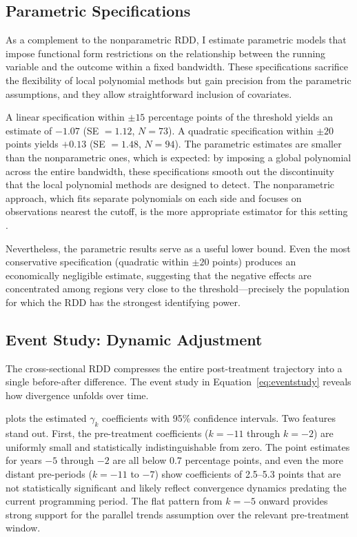 \documentclass[12pt]{article}
\begin{document}
\subsection{Parametric Specifications}

As a complement to the nonparametric RDD, I estimate parametric models that impose functional form restrictions on the relationship between the running variable and the outcome within a fixed bandwidth. These specifications sacrifice the flexibility of local polynomial methods but gain precision from the parametric assumptions, and they allow straightforward inclusion of covariates.

A linear specification within $\pm 15$ percentage points of the threshold yields an estimate of $-1.07$ (SE $= 1.12$, $N = 73$). A quadratic specification within $\pm 20$ points yields $+0.13$ (SE $= 1.48$, $N = 94$). The parametric estimates are smaller than the nonparametric ones, which is expected: by imposing a global polynomial across the entire bandwidth, these specifications smooth out the discontinuity that the local polynomial methods are designed to detect. The nonparametric approach, which fits separate polynomials on each side and focuses on observations nearest the cutoff, is the more appropriate estimator for this setting \citep{CalonicoCattaneoTitiunik2014, GelmanImbens2019}.

Nevertheless, the parametric results serve as a useful lower bound. Even the most conservative specification (quadratic within $\pm 20$ points) produces an economically negligible estimate, suggesting that the negative effects are concentrated among regions very close to the threshold---precisely the population for which the RDD has the strongest identifying power.

\subsection{Event Study: Dynamic Adjustment}

The cross-sectional RDD compresses the entire post-treatment trajectory into a single before-after difference. The event study in Equation~\eqref{eq:eventstudy} reveals how divergence unfolds over time.

 plots the estimated $\gamma_k$ coefficients with 95\% confidence intervals. Two features stand out. First, the pre-treatment coefficients ($k = -11$ through $k = -2$) are uniformly small and statistically indistinguishable from zero. The point estimates for years $-5$ through $-2$ are all below 0.7 percentage points, and even the more distant pre-periods ($k = -11$ to $-7$) show coefficients of 2.5--5.3 points that are not statistically significant and likely reflect convergence dynamics predating the current programming period. The flat pattern from $k = -5$ onward provides strong support for the parallel trends assumption over the relevant pre-treatment window.
\end{document}
